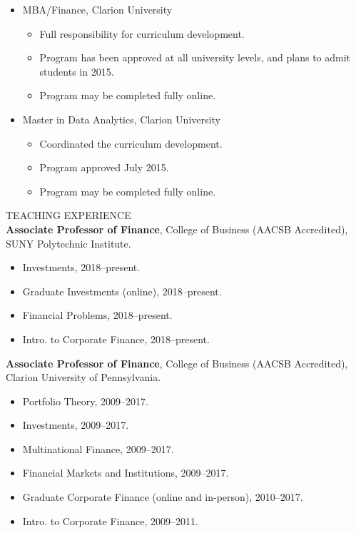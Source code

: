 \documentclass[9pt]{article}
\begin{document}
\begin{itemize}[noitemsep, nolistsep]
\item MBA/Finance, Clarion University
  \begin{itemize}[noitemsep, nolistsep]
    \item Full responsibility for curriculum development.
    \item Program has been approved at all university levels, and plans to admit students in 2015.
    \item Program may be completed fully online.
  \end{itemize}
\item Master in Data Analytics, Clarion University
  \begin{itemize}[noitemsep, nolistsep]
    \item Coordinated the curriculum development.
    \item Program approved July 2015.
    \item Program may be completed fully online.
  \end{itemize}
\end{itemize}
\vspace{10pt}
TEACHING EXPERIENCE\\
{\bf Associate Professor of Finance}, College of Business (AACSB Accredited), SUNY Polytechnic Institute.
\begin{itemize}[noitemsep, nolistsep]
\item Investments, 2018--present.
\item Graduate Investments (online), 2018--present.
\item Financial Problems, 2018--present.
\item Intro. to Corporate Finance, 2018--present.
\end{itemize}
{\bf Associate Professor of Finance}, College of Business (AACSB Accredited), Clarion University of Pennsylvania.
\begin{itemize}[noitemsep, nolistsep]
\item Portfolio Theory, 2009--2017.
\item Investments, 2009--2017.
\item Multinational Finance, 2009--2017.
\item Financial Markets and Institutions, 2009--2017.
\item Graduate Corporate Finance (online and in-person), 2010--2017.
\item Intro. to Corporate Finance, 2009--2011.
\end{itemize}
\end{document}
